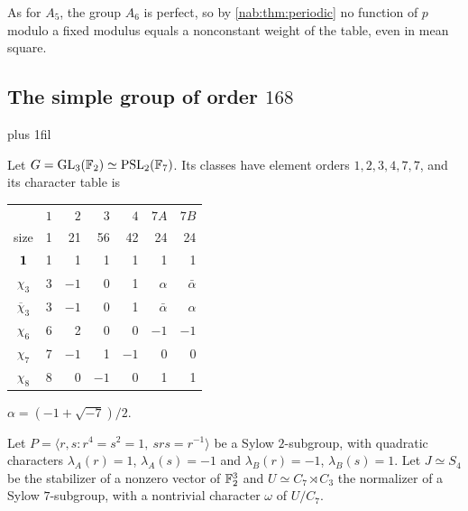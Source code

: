 As for $A_5$, the group $A_6$ is perfect, so by \cref{nab:thm:periodic} no function of
$p$ modulo a fixed modulus equals a nonconstant weight of the table, even in mean square.

\subsection{The simple group of order \texorpdfstring{$168$}{168}}\label{grp:sec:psl27}
{\rightskip=0pt plus 1fil\relax
{}
}

Let $G=\operatorname{GL}_3(\mathbb{F}_2)\simeq\operatorname{PSL}_2(\mathbb{F}_7)$. Its classes have element orders
$1,2,3,4,7,7$, and its character table \cite{DokchitserGroupNames} is
\begin{center}
\begin{tabular}{crrrrrr}
\toprule
 & $1$ & $2$ & $3$ & $4$ & $7A$ & $7B$\\
size & 1 & 21 & 56 & 42 & 24 & 24\\\midrule
$\mathbf{1}$ & 1 & 1 & 1 & 1 & 1 & 1\\
$\chi_3$ & 3 & $-1$ & 0 & 1 & $\alpha$ & $\bar\alpha$\\
$\overline\chi_3$ & 3 & $-1$ & 0 & 1 & $\bar\alpha$ & $\alpha$\\
$\chi_6$ & 6 & 2 & 0 & 0 & $-1$ & $-1$\\
$\chi_7$ & 7 & $-1$ & 1 & $-1$ & 0 & 0\\
$\chi_8$ & 8 & 0 & $-1$ & 0 & 1 & 1\\
\bottomrule
\end{tabular}
\qquad $\alpha=(-1+\sqrt{-7})/2$.
\end{center}
Let $P=\langle r,s:r^4=s^2=1,\ srs=r^{-1}\rangle$ be a Sylow $2$-subgroup, with
quadratic characters $\lambda_A(r)=1$, $\lambda_A(s)=-1$ and
$\lambda_B(r)=-1$, $\lambda_B(s)=1$. Let $J\simeq S_4$ be the stabilizer of a
nonzero vector of $\mathbb{F}_2^3$ and $U\simeq C_7\rtimes C_3$ the normalizer of a
Sylow $7$-subgroup, with a nontrivial character $\omega$ of $U/C_7$.


